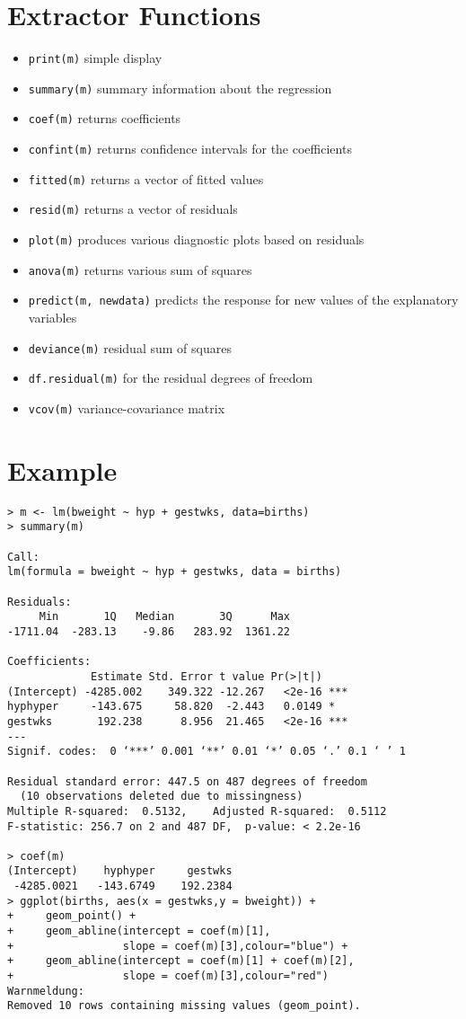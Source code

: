 \documentclass[11pt]{article}
\begin{document}
\section{Extractor Functions}
\begin{itemize}
\item \texttt{print(m)} simple display
\item \texttt{summary(m)} summary information about the regression
\item \texttt{coef(m)} returns coefficients
\item \texttt{confint(m)} returns confidence intervals for the coefficients
\item \texttt{fitted(m)} returns a vector of fitted values
\item \texttt{resid(m)} returns a vector of residuals
\item \texttt{plot(m)} produces various diagnostic plots based on residuals
\item \texttt{anova(m)} returns various sum of squares
\item \texttt{predict(m, newdata)} predicts the response for new values of the explanatory variables
\item \texttt{deviance(m)} residual sum of squares
\item \texttt{df.residual(m)} for the residual degrees of freedom
\item \texttt{vcov(m)} variance-covariance matrix
\end{itemize}


\section{Example}
\begin{verbatim}
> m <- lm(bweight ~ hyp + gestwks, data=births)
> summary(m)

Call:
lm(formula = bweight ~ hyp + gestwks, data = births)

Residuals:
     Min       1Q   Median       3Q      Max 
-1711.04  -283.13    -9.86   283.92  1361.22 

Coefficients:
             Estimate Std. Error t value Pr(>|t|)    
(Intercept) -4285.002    349.322 -12.267   <2e-16 ***
hyphyper     -143.675     58.820  -2.443   0.0149 *  
gestwks       192.238      8.956  21.465   <2e-16 ***
---
Signif. codes:  0 ‘***’ 0.001 ‘**’ 0.01 ‘*’ 0.05 ‘.’ 0.1 ‘ ’ 1

Residual standard error: 447.5 on 487 degrees of freedom
  (10 observations deleted due to missingness)
Multiple R-squared:  0.5132,	Adjusted R-squared:  0.5112 
F-statistic: 256.7 on 2 and 487 DF,  p-value: < 2.2e-16

> coef(m)
(Intercept)    hyphyper     gestwks 
 -4285.0021   -143.6749    192.2384 
> ggplot(births, aes(x = gestwks,y = bweight)) +
+     geom_point() +
+     geom_abline(intercept = coef(m)[1],
+                 slope = coef(m)[3],colour="blue") +
+     geom_abline(intercept = coef(m)[1] + coef(m)[2],
+                 slope = coef(m)[3],colour="red")
Warnmeldung:
Removed 10 rows containing missing values (geom_point).   
\end{verbatim}
\end{document}
